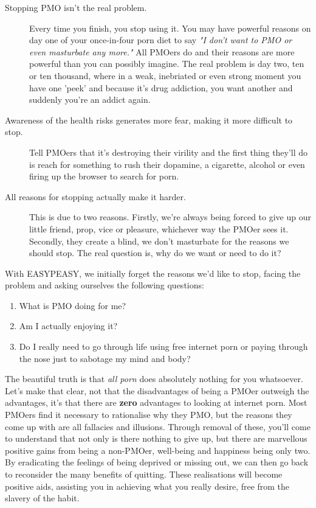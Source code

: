\documentclass[easypeasy.tex]{subfiles}
\begin{document}
\begin{description}
  \item [Stopping PMO isn't the real problem.] Every time you finish, you stop using it. You may have powerful reasons on day one of your once-in-four porn diet to say \textit{"I don't want to PMO or even masturbate any more."} All PMOers do and their reasons are more powerful than you can possibly imagine. The real problem is day two, ten or ten thousand, where in a weak, inebriated or even strong moment you have one 'peek' and because it's drug addiction, you want another and suddenly you're an addict again.

\item [Awareness of the health risks generates more fear, making it more difficult to stop.] Tell PMOers that it's destroying their virility and the first thing they'll do is reach for something to rush their dopamine, a cigarette, alcohol or even firing up the browser to search for porn.

\item [All reasons for stopping actually make it harder.] This is due to two reasons. Firstly, we're always being forced to give up our little friend, prop, vice or pleasure, whichever way the PMOer sees it. Secondly, they create a blind, we don't masturbate for the reasons we should stop. The real question is, why do we want or need to do it?
\end{description}

With EASYPEASY, we initially forget the reasons we'd like to stop, facing the problem and asking ourselves the following questions:

\begin{enumerate}
\item What is PMO doing for me?
\item Am I actually enjoying it?
\item Do I really need to go through life using free internet porn or paying through the nose just to sabotage my mind and body?
\end{enumerate}

The beautiful truth is that \textit{all porn} does absolutely nothing for you whatsoever. Let's make that clear, not that the disadvantages of being a PMOer outweigh the advantages, it's that there are \textbf{zero} advantages to looking at internet porn. Most PMOers find it necessary to rationalise why they PMO, but the reasons they come up with are all fallacies and illusions. Through removal of these, you'll come to understand that not only is there nothing to give up, but there are marvellous positive gains from being a non-PMOer, well-being and happiness being only two. By eradicating the feelings of being deprived or missing out, we can then go back to reconsider the many benefits of quitting. These realisations will become positive aids, assisting you in achieving what you really desire, free from the slavery of the habit.
\end{document}
